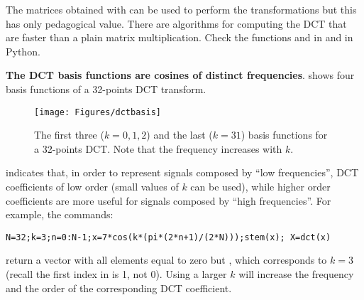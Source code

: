 

The matrices obtained with  can be used to perform the transformations but
this has only pedagogical value. There are algorithms for computing the DCT that are faster
than a plain matrix multiplication. Check the functions  and  in {\matlab}
and  in Python.
\eExample

\bExample \textbf{The DCT basis functions are cosines of distinct frequencies}.
 shows four basis functions of a 32-points DCT transform.

\begin{figure}[!htb]
        \centering
                \texttt{[image: Figures/dctbasis]}            
        \caption[{The first three ($k=0,1,2$) and the last ($k=31$) basis functions for a 32-points DCT.}]{The first three ($k=0,1,2$) and the last ($k=31$) basis functions for a 32-points DCT. Note that the frequency increases with $k$.\label{fig:dctbasis}}
\end{figure}

 indicates that, in order to represent signals composed by ``low frequencies'', DCT coefficients of low order (small values of $k$ can be used), while higher order coefficients are more useful for signals composed by ``high frequencies''.
For example, the commands:
\begin{lstlisting}
N=32;k=3;n=0:N-1;x=7*cos(k*(pi*(2*n+1)/(2*N)));stem(x); X=dct(x)
\end{lstlisting}
return a vector  with all elements equal to zero but , which corresponds to $k=3$ (recall the first index in {\matlab} is 1, not 0). Using a larger $k$ will increase
the frequency and the order of the corresponding DCT coefficient.
\eExample 

